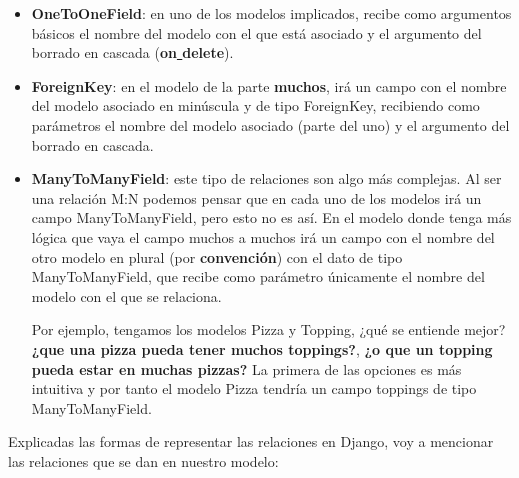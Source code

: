         \begin{itemize}
            \item \textbf{OneToOneField}: en uno de los modelos implicados, recibe como
            argumentos básicos el nombre del modelo con el que está asociado y el argumento
            del borrado en cascada (\textbf{on\underline{ }delete}).
            \item \textbf{ForeignKey}: en el modelo de la parte \textbf{muchos}, irá un campo
            con el nombre del modelo asociado en minúscula y de tipo ForeignKey, recibiendo
            como parámetros el nombre del modelo asociado (parte del uno) y el argumento del
            borrado en cascada.
            \item \textbf{ManyToManyField}: este tipo de relaciones son algo más complejas. Al
            ser una relación M:N podemos pensar que en cada uno de los modelos irá un campo
            ManyToManyField, pero esto no es así. En el modelo donde tenga más lógica que vaya
            el campo muchos a muchos irá un campo con el nombre del otro modelo en plural (por
            \textbf{convención}) con el dato de tipo ManyToManyField, que recibe como parámetro
            únicamente el nombre del modelo con el que se relaciona.

            Por ejemplo, tengamos los modelos Pizza y Topping, ¿qué se entiende mejor?
            \textbf{¿que una pizza pueda tener muchos toppings?}, \textbf{¿o que un
            topping pueda estar en muchas pizzas?} La primera de las opciones es más
            intuitiva y por tanto el modelo Pizza tendría un campo toppings de tipo
            ManyToManyField.
        \end{itemize}

    Explicadas las formas de representar las relaciones en Django, voy a mencionar las
    relaciones que se dan en nuestro modelo:

